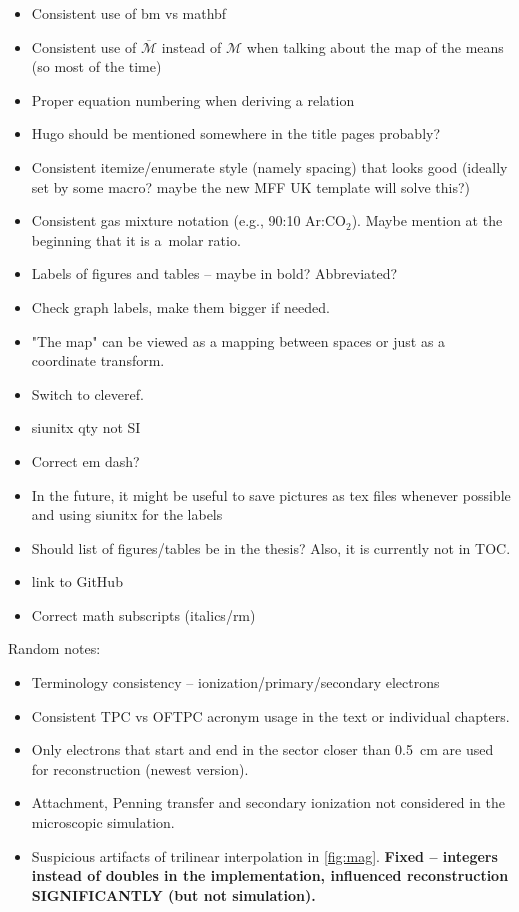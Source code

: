 {\begin{itemize}[topsep=4pt,itemsep=2pt]
				\item Consistent use of bm vs mathbf
				\item Consistent use of $\overbar{\mathcal{M}}$ instead of $\mathcal{M}$ when talking about the map of the means (so most of the time)
				\item Proper equation numbering when deriving a relation
				\item Hugo should be mentioned somewhere in the title pages probably?
				\item Consistent itemize/enumerate style (namely spacing) that looks good (ideally set by some macro? maybe the new MFF UK template will solve this?)
				\item Consistent gas mixture notation (e.g., 90:10 Ar:CO$_2$). Maybe mention at the beginning that it is a~molar ratio.
				\item Labels of figures and tables -- maybe in bold? Abbreviated?
				\item Check graph labels, make them bigger if needed.
				\item "The map" can be viewed as a mapping between spaces or just as a coordinate transform.
				\item Switch to cleveref.
				\item siunitx qty not SI
				\item Correct em dash?
				\item In the future, it might be useful to save pictures as tex files whenever possible and using siunitx for the labels
				\item Should list of figures/tables be in the thesis? Also, it is currently not in TOC.
				\item link to GitHub
				\item Correct math subscripts (italics/rm)
			\end{itemize}
		Random notes:
			\begin{itemize}[topsep=4pt,itemsep=2pt]
				\item Terminology consistency -- ionization/primary/secondary electrons
				\item Consistent \ac{TPC} vs \ac{OFTPC} acronym usage in the text or individual chapters.
				\item Only electrons that start and end in the sector closer than 0.5~cm are used for reconstruction (newest version).
				\item Attachment, Penning transfer and secondary ionization not considered in the microscopic simulation.
				\item Suspicious artifacts of trilinear interpolation in \cref{fig:mag}. \textbf{Fixed -- integers instead of doubles in the implementation, influenced reconstruction SIGNIFICANTLY (but not simulation).}

\end{itemize}}
